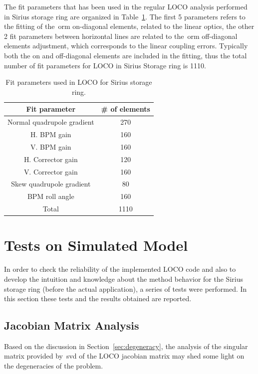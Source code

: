 The fit parameters that has been used in the regular LOCO analysis performed in Sirius storage ring are organized in Table~\ref{tab:fit_params}. The first 5 parameters refers to the fitting of the~\gls{orm} on-diagonal elements, related to the linear optics, the other 2 fit parameters between horizontal lines are related to the~\gls{orm} off-diagonal elements adjustment, which corresponds to the linear coupling errors. Typically both the on and off-diagonal elements are included in the fitting, thus the total number of fit parameters for LOCO in Sirius Storage ring is 1110.
\begin{table}
    \centering
    \caption{Fit parameters used in LOCO for Sirius storage ring.}
    \label{tab:fit_params}
    \begin{tabular}{cc}
        \toprule\toprule
        Fit parameter & \# of elements \\
        \hline
        Normal quadrupole gradient & 270 \\
        H. BPM gain & 160 \\
        V. BPM gain & 160 \\
        H. Corrector gain & 120 \\
        V. Corrector gain & 160 \\
        \hline
        Skew quadrupole gradient & 80 \\
        BPM roll angle & 160 \\ 
        \hline
        Total & 1110 \\
        \bottomrule\bottomrule
    \end{tabular}
\end{table}

\section{Tests on Simulated Model}
In order to check the reliability of the implemented LOCO code and also to develop the intuition and knowledge about the method behavior for the Sirius storage ring (before the actual application), a series of tests were performed. In this section these tests and the results obtained are reported.
\subsection{Jacobian Matrix Analysis}
Based on the discussion in Section~\ref{sec:degeneracy}, the analysis of the singular matrix provided by~\gls{svd} of the LOCO jacobian matrix may shed some light on the degeneracies of the problem.

